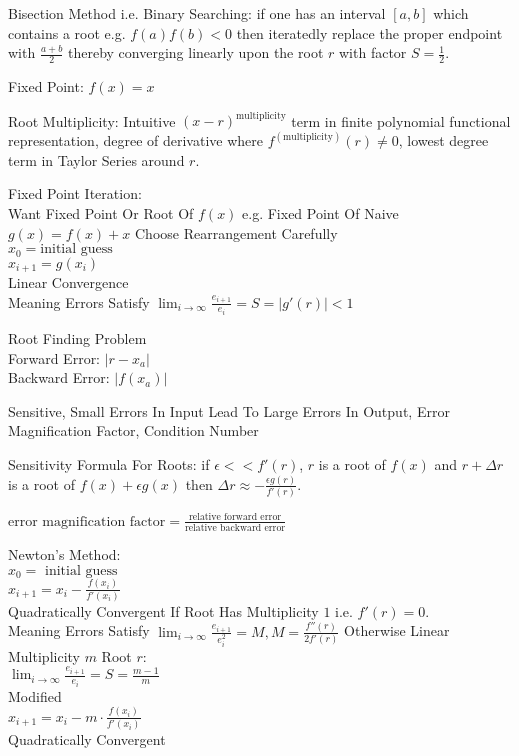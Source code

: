 Bisection Method i.e. Binary Searching: if one has an interval $[a,b]$ which contains a root e.g. $f(a)f(b)<0$ then iteratedly replace the proper endpoint with $\frac{a+b}{2}$ thereby converging linearly upon the root $r$ with factor $S = \frac{1}{2}$.

Fixed Point: $f(x)=x$

Root Multiplicity: Intuitive $(x-r)^{\text{multiplicity}}$ term in finite polynomial functional representation, degree of derivative where $f^{(\text{multiplicity})}(r) \neq 0$, lowest degree term in Taylor Series around $r$.

Fixed Point Iteration: \\
Want Fixed Point Or Root Of $f(x)$ e.g. Fixed Point Of Naive $g(x)=f(x)+x$ Choose Rearrangement Carefully \\
$x_0 = \text{initial guess}$ \\
$x_{i+1} = g(x_i)$ \\
Linear Convergence \\
Meaning Errors Satisfy $\lim_{i \to \infty} \frac{e_{i+1}}{e_i} = S = |g'(r)| < 1$

Root Finding Problem \\
Forward Error: $|r-x_a|$ \\
Backward Error: $|f(x_a)|$

Sensitive, Small Errors In Input Lead To Large Errors In Output, Error Magnification Factor, Condition Number

Sensitivity Formula For Roots: if $\epsilon << f'(r)$, $r$ is a root of $f(x)$ and $r + \Delta r$ is a root of $f(x) + \epsilon g(x)$ then $\Delta r \approx - \frac{\epsilon g(r)}{f'(r)}$.

$\text{error magnification factor} = \frac{\text{relative forward error}}{\text{relative backward error}}$

Newton's Method: \\
$x_0 = \text{ initial guess}$ \\
$x_{i+1} = x_i - \frac{f(x_i)}{f'(x_i)}$ \\
Quadratically Convergent If Root Has Multiplicity $1$ i.e. $f'(r) = 0$. \\
Meaning Errors Satisfy $\lim_{i \to \infty} \frac{e_{i+1}}{e_i^2} = M, M = \frac{f''(r)}{2f'(r)}$ Otherwise Linear \\
Multiplicity $m$ Root $r$: \\
$\lim_{i \to \infty} \frac{e_{i+1}}{e_i} = S = \frac{m-1}{m}$ \\
Modified \\
$x_{i+1} = x_i - m \cdot \frac{f(x_i)}{f'(x_i)}$ \\
Quadratically Convergent

